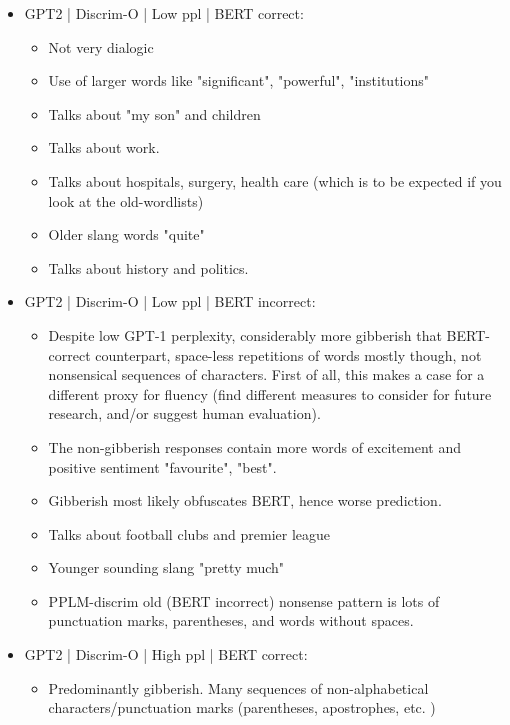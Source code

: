 
\begin{itemize}
    \item GPT2 | Discrim-O | Low ppl | BERT correct:
    \begin{itemize}
        \item Not very dialogic 
        \item Use of larger words like "significant", "powerful", "institutions"
        \item Talks about "my son" and children
        \item Talks about work.
        \item Talks about hospitals, surgery, health care (which is to be expected if you look at the old-wordlists)
        \item Older slang words "quite"
        \item Talks about history and politics.
    \end{itemize}
    \item GPT2 | Discrim-O | Low ppl | BERT incorrect:
    \begin{itemize}
        \item Despite low GPT-1 perplexity, considerably more gibberish that BERT-correct counterpart, space-less repetitions of words mostly though, not nonsensical sequences of characters. First of all, this makes a case for a different proxy for fluency (find different measures to consider for future research, and/or suggest human evaluation).
        \item The non-gibberish responses contain more words of excitement and positive sentiment "favourite", "best".
        \item Gibberish most likely obfuscates BERT, hence worse prediction.
        \item Talks about football clubs and premier league
        \item Younger sounding slang "pretty much"
        \item PPLM-discrim old (BERT incorrect) nonsense pattern is lots of punctuation marks, parentheses, and words without spaces.
    \end{itemize}
    \item GPT2 | Discrim-O | High ppl | BERT correct:
    \begin{itemize}
        \item Predominantly gibberish. 
        Many sequences of non-alphabetical characters/punctuation marks (parentheses, apostrophes, etc. )

\end{itemize}
\end{itemize}
